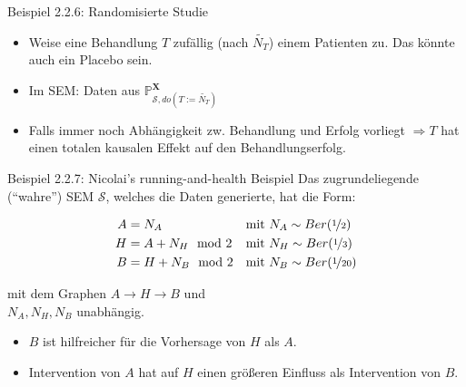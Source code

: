 \begin{frame}{Beispiel 2.2.6: Randomisierte Studie}
    \begin{itemize}
        \item<1-> Weise eine Behandlung $T$ zufällig (nach $\tilde{N_T}$) einem
              Patienten zu. Das könnte auch ein Placebo sein.
        \item<2-> Im SEM: Daten aus $\mathbb{P}_{\mathcal{S}, do(T:=\tilde{N_T})}^{\mathbf{X}}$
        \item<3-> Falls immer noch Abhängigkeit zw. Behandlung und Erfolg
              vorliegt $\Rightarrow T$ hat einen totalen kausalen Effekt auf
              den Behandlungserfolg.
    \end{itemize}
\end{frame}

\begin{frame}{Beispiel 2.2.7: Nicolai's running-and-health Beispiel}
    Das zugrundeliegende (\enquote{wahre}) SEM $\mathcal{S}$, welches die Daten
    generierte, hat die Form:

    \begin{align}
        A &= N_A            &&\text{mit } N_A \sim Ber(\nicefrac{1}{2})\\
        H &= A + N_H \mod 2 &&\text{mit } N_H \sim Ber(\nicefrac{1}{3})\\
        B &= H + N_B \mod 2 &&\text{mit } N_B \sim Ber(\nicefrac{1}{20})
    \end{align}

    mit dem Graphen $A \rightarrow H \rightarrow B$ und\\
    $N_A, N_H, N_B$ unabhängig.

    \begin{itemize}
        \item<1->  $B$ ist hilfreicher für die Vorhersage von $H$ als $A$.
        \item<2->  Intervention von $A$ hat auf $H$ einen größeren Einfluss als Intervention von $B$.
    \end{itemize}
\end{frame}


